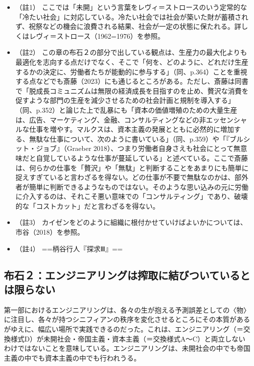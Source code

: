 \begin{itemize}
\tightlist
\item
  （註1）
  ここでは「未開」という言葉をレヴィ＝ストロースのいう定常的な「冷たい社会」に対応している。冷たい社会では社会が築いた財が蓄積されず、祝祭などの機会に浪費される結果、社会が一定の状態に保たれる。詳しくはレヴィ＝ストロース（1962=1976）\cite{LeviStrauss}を参照。
\item
  （註2）
  この章の布石２の部分で出している観点は、生産力の最大化よりも最適化を志向する点だけでなく、そこで「何を、どのように、どれだけ生産するかの決定に、労働者たちが能動的に参与する」（同、p.364）ことを重視する点などでも斎藤（2023）\cite{Saito}にも通じるところがある。ただし、斎藤は同書で「脱成長コミュニズムは無限の経済成長を目指すのを止め、贅沢な消費を促すような部門の生産を減少させるための社会計画と規制を導入する」（同、p.352）と論じた上で乱暴にも「資本の価値増殖のための大量生産は、広告、マーケティング、金融、コンサルティングなどの非エッセンシャルな仕事を増やす。マルクスは、資本主義の発展とともに必然的に増加する、無駄な仕事について、次のように書いている」（同、p.359）や「『ブルシット・ジョブ』（Graeber
  2018）、つまり労働者自身さえも社会にとって無意味だと自覚しているような仕事が蔓延している」と述べている。ここで斎藤は、何らかの仕事を「贅沢」や「無駄」と判断することをあまりにも簡単に捉えすぎていると言わざるを得ない。どの仕事が不要で無駄なのかは、部外者が簡単に判断できるようなものではない。そのような思い込みの元に労働に介入するのは、それこそ悪い意味での「コンサルティング」であり、破壊的な「コストカット」だと言わざるを得ない。
\item
  （註3）
  カイゼンをどのように組織に根付かせていけばよいかについては、市谷（2018）\cite{Ichitani}を参照。
\item
  （註4） ==柄谷行人『探求Ⅲ』==
\end{itemize}

\subsection{布石２：エンジニアリングは搾取に結びついているとは限らない}\label{ux5e03ux77f3uxff12ux30a8ux30f3ux30b8ux30cbux30a2ux30eaux30f3ux30b0ux306fux643eux53d6ux306bux7d50ux3073ux3064ux3044ux3066ux3044ux308bux3068ux306fux9650ux3089ux306aux3044}

第一部におけるエンジニアリングは、各々の生が抱える予測誤差としての〈物〉に注目し、各々が持つシニフィアンの秩序を変化させるところにその本質があるがゆえに、幅広い場所で実践できるのだった。これは、エンジニアリング（＝交換様式D）が未開社会・帝国主義・資本主義（＝交換様式A～C）と両立しないわけではないことを意味している。エンジニアリングは、未開社会の中でも帝国主義の中でも資本主義の中でも行われうる。

